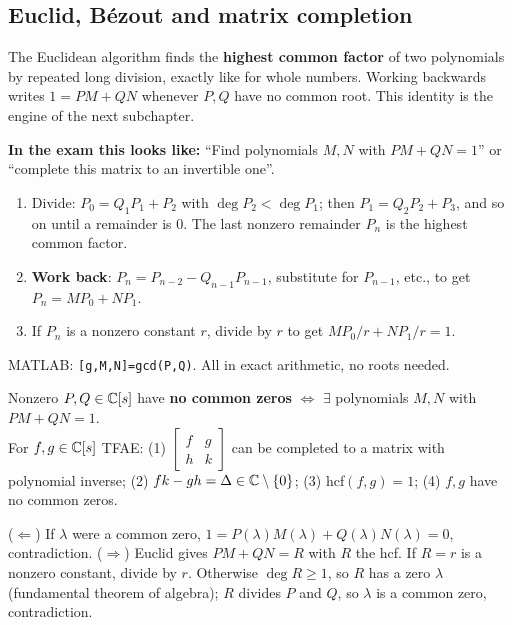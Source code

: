 \subsection{Euclid, B\'ezout and matrix completion \texorpdfstring{}{}}\label{ss:5-5}
\begin{plainbox}
The Euclidean algorithm finds the \textbf{highest common factor} of two polynomials by repeated long division, exactly like for
whole numbers. Working backwards writes $1=PM+QN$ whenever $P,Q$ have no common root. This identity is the engine of the next subchapter.
\par\smallskip\textbf{In the exam this looks like:} ``Find polynomials $M,N$ with $PM+QN=1$'' or ``complete this matrix to an invertible one''.
\end{plainbox}
\begin{methodbox}[title={Euclidean algorithm and B\'ezout for polynomials}]
\begin{enumerate}
\item Divide: $P_0=Q_1P_1+P_2$ with $\deg P_2<\deg P_1$; then $P_1=Q_2P_2+P_3$, and so on until a remainder is $0$. The last nonzero remainder $P_n$ is the highest common factor.
\item \textbf{Work back}: $P_n=P_{n-2}-Q_{n-1}P_{n-1}$, substitute for $P_{n-1}$, etc., to get $P_n=MP_0+NP_1$.
\item If $P_n$ is a nonzero constant $r$, divide by $r$ to get $MP_0/r+NP_1/r=1$.
\end{enumerate}
MATLAB: \texttt{[g,M,N]=gcd(P,Q)}. All in exact arithmetic, no roots needed.
\end{methodbox}
\begin{thmbox}[title={Lemma 0.47 and Proposition 0.48}]
Nonzero $P,Q\in\mathbb{C}[s]$ have \textbf{no common zeros} $\iff$ $\exists$ polynomials $M,N$ with $PM+QN=1$.\\
For $f,g\in\mathbb{C}[s]$ TFAE: (1) $\begin{bmatrix}f&g\\h&k\end{bmatrix}$ can be completed to a matrix with polynomial inverse; (2) $fk-gh=\Delta\in\mathbb{C}\setminus\{0\}$; (3) hcf$(f,g)=1$; (4) $f,g$ have no common zeros.
\end{thmbox}
\begin{proofbox}[title={Proof of Lemma 0.47}]
($\Leftarrow$) If $\lambda$ were a common zero, $1=P(\lambda)M(\lambda)+Q(\lambda)N(\lambda)=0$, contradiction.
($\Rightarrow$) Euclid gives $PM+QN=R$ with $R$ the hcf. If $R=r$ is a nonzero constant, divide by $r$. Otherwise $\deg R\ge1$, so $R$ has a zero $\lambda$ (fundamental theorem of algebra); $R$ divides $P$ and $Q$, so $\lambda$ is a common zero, contradiction.
\end{proofbox}
